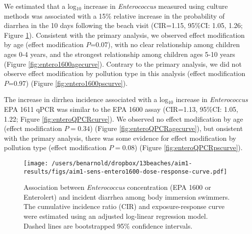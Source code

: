 \documentclass[12pt]{article}\usepackage[]{graphicx}\usepackage[]{color}
\begin{document}
We estimated that a log$_{10}$ increase in \emph{Enterococcus} measured using culture methods was associated with a 15\% relative increase in the probability of diarrhea in the 10 days following the beach visit (CIR=1.15, 95\%CI: 1.05, 1.26; Figure \ref{fig:entero1600curve}). Consistent with the primary analysis, we observed effect modification by age (effect modification $P$=0.07), with no clear relationship among children ages 0-4 years, and the strongest relationship among children ages 5-10 years (Figure \ref{fig:entero1600agecurve}).  Contrary to the primary analysis, we did not observe effect modification by pollution type in this analysis (effect modification $P$=0.97) (Figure \ref{fig:entero1600pscurve}).

The increase in dirrhea incidence associated with a log$_{10}$ increase in \emph{Enterococcus} EPA 1611 qPCR was similar to the EPA 1600 assay (CIR=1.13, 95\%CI: 1.05, 1.22; Figure \ref{fig:enteroQPCRcurve}). We observed no effect modification by age (effect modification $P=0.34$) (Figure \ref{fig:enteroQPCRagecurve}), but onsistent with the primary analysis, there was some evidence for effect modification by pollution type  (effect modification $P=0.08$) (Figure \ref{fig:enteroQPCRpscurve}).

\begin{figure}[h!tb]
\begin{center}
\texttt{[image: /users/benarnold/dropbox/13beaches/aim1-results/figs/aim1-sens-entero1600-dose-response-curve.pdf]}
\caption{Association between \emph{Enterococcus} concentration (EPA 1600 or Enterolert) and incident diarrhea among body immersion swimmers. The cumulative incidence ratio (CIR) and exposure-response curve were estimated using an adjusted log-linear regression model.  Dashed lines are bootstrapped 95\% confidence intervals. \label{fig:entero1600curve}}
\end{center}
\end{figure}
\end{document}
